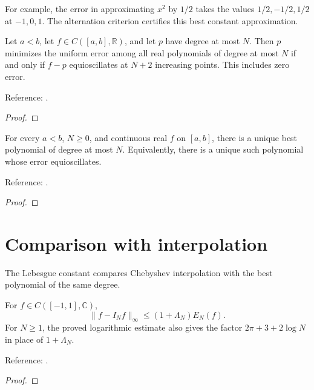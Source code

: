 For example, the error in approximating $x^2$ by $1/2$ takes the values $1/2,-1/2,1/2$ at $-1,0,1$. The alternation criterion certifies this best constant approximation.

\begin{theorem}
\label{thm:equioscillation-characterization}
\leanok
Let $a<b$, let $f\in C([a,b],\mathbb R)$, and let $p$ have degree at most $N$.
Then $p$ minimizes the uniform error among all real polynomials of degree at
most $N$ if and only if $f-p$ equioscillates at $N+2$ increasing points.
This includes zero error.

Reference: \cite[Theorem 10.1]{atap}.
\end{theorem}
\begin{proof}
\leanok
\end{proof}

\begin{theorem}
\label{thm:unique-real-minimax}
\leanok
For every $a<b$, $N\ge0$, and continuous real $f$ on $[a,b]$, there is a
unique best polynomial of degree at most $N$. Equivalently, there is a unique
such polynomial whose error equioscillates.

Reference: \cite[Theorem 10.1 and Exercise 10.10]{atap}.
\end{theorem}
\begin{proof}
\leanok
\end{proof}


\section{Comparison with interpolation}\label{sec:textbook-best-near-best}

The Lebesgue constant compares Chebyshev interpolation with the best polynomial of the same degree.

\begin{theorem}
\label{thm:infimum-near-best}
\leanok
For $f\in C([-1,1],\mathbb C)$,
\[
 \|f-I_Nf\|_\infty\le(1+\Lambda_N)E_N(f).
\]
For $N\ge1$, the proved logarithmic estimate also gives the factor
$2\pi+3+2\log N$ in place of $1+\Lambda_N$.


Reference: \cite[Theorem 15.1 and Chapter 16]{atap}.
\end{theorem}
\begin{proof}
\leanok
\end{proof}

